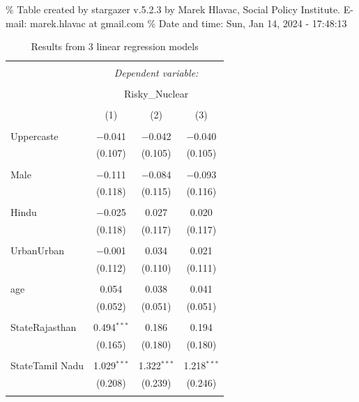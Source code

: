 \documentclass[
]{article}
\begin{document}
\begingroup\setlength{\tabcolsep}{1pt}

\renewcommand{\arraystretch}{0.7}

\% Table created by stargazer v.5.2.3 by Marek Hlavac, Social Policy
Institute. E-mail: marek.hlavac at gmail.com \% Date and time: Sun, Jan
14, 2024 - 17:48:13

\begin{table}[!htbp] \centering 
  \caption{Results from 3 linear regression models} 
  \label{} 
\begin{tabular}{@{\extracolsep{5pt}}lccc} 
\\[-1.8ex]\hline 
\hline \\[-1.8ex] 
 & \multicolumn{3}{c}{\textit{Dependent variable:}} \\ 
\cline{2-4} 
\\[-1.8ex] & \multicolumn{3}{c}{Risky\_Nuclear} \\ 
\\[-1.8ex] & (1) & (2) & (3)\\ 
\hline \\[-1.8ex] 
 Uppercaste & $-$0.041 & $-$0.042 & $-$0.040 \\ 
  & (0.107) & (0.105) & (0.105) \\ 
  & & & \\ 
 Male & $-$0.111 & $-$0.084 & $-$0.093 \\ 
  & (0.118) & (0.115) & (0.116) \\ 
  & & & \\ 
 Hindu & $-$0.025 & 0.027 & 0.020 \\ 
  & (0.118) & (0.117) & (0.117) \\ 
  & & & \\ 
 UrbanUrban & $-$0.001 & 0.034 & 0.021 \\ 
  & (0.112) & (0.110) & (0.111) \\ 
  & & & \\ 
 age & 0.054 & 0.038 & 0.041 \\ 
  & (0.052) & (0.051) & (0.051) \\ 
  & & & \\ 
 StateRajasthan & 0.494$^{***}$ & 0.186 & 0.194 \\ 
  & (0.165) & (0.180) & (0.180) \\ 
  & & & \\ 
 StateTamil Nadu & 1.029$^{***}$ & 1.322$^{***}$ & 1.218$^{***}$ \\ 
  & (0.208) & (0.239) & (0.246) \\ 
  & & & \\ 

\end{tabular}
\end{table}
\end{document}
